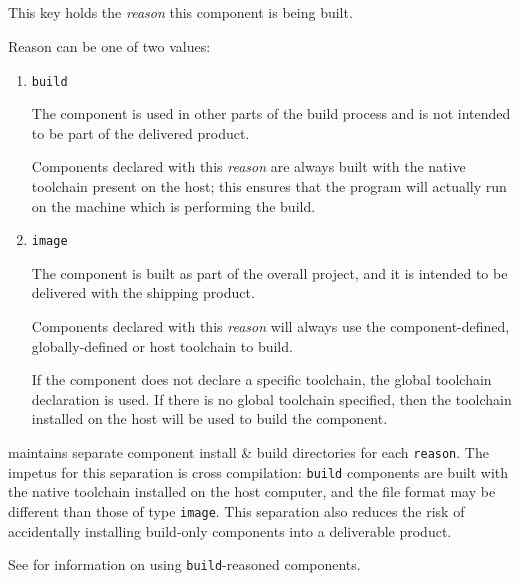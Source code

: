 \subsection{}\label{variables:reason}

This key holds the \emph{reason} this component is being built.

Reason can be one of two values:

  \begin{enumerate}
  \item \texttt{build}

    The component is used in other parts of the build process and is
    not intended to be part of the delivered product.

    Components declared with this \emph{reason} are always built with
    the native toolchain present on the host; this ensures that the
    program will actually run on the machine which is performing the
    build.

  \item \texttt{image}

    The component is built as part of the overall project, and it is
    intended to be delivered with the shipping product.

    Components declared with this \emph{reason} will always use the
    component-defined, globally-defined or host toolchain to build.

    If the component does not declare a specific toolchain, the global
    toolchain declaration is used.  If there is no global toolchain
    specified, then the toolchain installed on the host will be used
    to build the component.

  \end{enumerate}

  \lmsbw maintains separate component install \& build directories for
  each \texttt{reason}.  The impetus for this separation is cross
  compilation: \texttt{build} components are built with the native
  toolchain installed on the host computer, and the file format may be
  different than those of type \texttt{image}.  This separation also
  reduces the risk of accidentally installing build-only components
  into a deliverable product.

  See  for information on using
  \texttt{build}-reasoned components.


\subsection{}\label{variables:source-directory}

